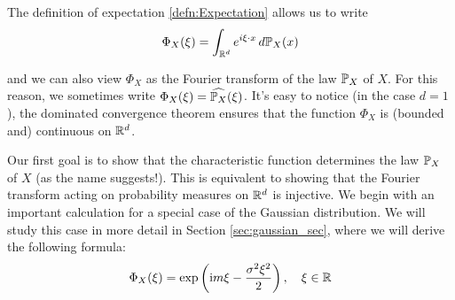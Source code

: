 \documentclass[../Main.tex]{subfiles}
\begin{document}

The definition of expectation \ref{defn:Expectation} allows us to write
\[ \Phi_X(\xi) = \int_{\mathbb{R}^d} e^{i \xi \cdot x} \,d\mathbb{P}_X(x) \]

and we can also view $\Phi_X$ as the Fourier transform of the law $\mathbb{P}_X$ of $X$. For this reason, we sometimes write $\Phi_X(\xi) = \widehat{\mathbb{P}_X}(\xi)$. It's easy to notice (in the case $d = 1$), the dominated convergence theorem ensures that the function $\Phi_X$ is (bounded and) continuous on $\mathbb{R}^d$.

Our first goal is to show that the characteristic function determines the law $\mathbb{P}_X$ of $X$ (as the name suggests!). This is equivalent to showing that the Fourier transform acting on probability measures on $\mathbb{R}^d$ is injective. We begin with an important calculation for a special case of the Gaussian distribution. We will study this case in more detail in Section \ref{sec:gaussian_sec}, where we will derive the following formula:
\[ \Phi_X(\xi)=\exp \left(\mathrm{i} m \xi-\frac{\sigma^2 \xi^2}{2}\right), \quad \xi \in \mathbb{R} \]
\end{document}
